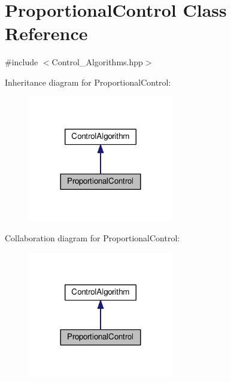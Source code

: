 \hypertarget{classProportionalControl}{}\section{Proportional\+Control Class Reference}
\label{classProportionalControl}


{\ttfamily \#include $<$Control\+\_\+\+Algorithms.\+hpp$>$}



Inheritance diagram for Proportional\+Control\+:\nopagebreak
\begin{figure}[H]
\begin{center}
\leavevmode
\includegraphics[width=180pt]{classProportionalControl__inherit__graph}
\end{center}
\end{figure}


Collaboration diagram for Proportional\+Control\+:
\nopagebreak
\begin{figure}[H]
\begin{center}
\leavevmode
\includegraphics[width=180pt]{classProportionalControl__coll__graph}
\end{center}
\end{figure}
